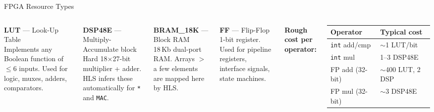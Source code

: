 \documentclass[aspectratio=169,12pt]{beamer}
\begin{document}
\begin{frame}{FPGA Resource Types}
\vspace{0.1cm}
\begin{columns}[T,totalwidth=\textwidth]


  \colorbox{Navy!8}{\parbox{\dimexpr\linewidth-2\fboxsep\relax}{\vspace{4pt}
    {\color{Navy}\bfseries LUT} — Look-Up Table\\[2pt]
    {\small Implements any Boolean function of $\leq$6 inputs.
    Used for logic, muxes, adders, comparators.}
  \vspace{4pt}}}
  \vspace{5pt}

  \colorbox{Teal!10}{\parbox{\dimexpr\linewidth-2\fboxsep\relax}{\vspace{4pt}
    {\color{Teal}\bfseries DSP48E} — Multiply-Accumulate block\\[2pt]
    {\small Hard 18$\times$27-bit multiplier + adder.
    HLS infers these automatically for \texttt{*} and \texttt{MAC}.}
  \vspace{4pt}}}
  \vspace{5pt}

  \colorbox{Orange!10}{\parbox{\dimexpr\linewidth-2\fboxsep\relax}{\vspace{4pt}
    {\color{Orange}\bfseries BRAM\_18K} — Block RAM\\[2pt]
    {\small 18\,Kb dual-port RAM. Arrays $>$ a few elements
    are mapped here by HLS.}
  \vspace{4pt}}}


  \vspace{0.1cm}

  \colorbox{BoxGray!10}{\parbox{\dimexpr\linewidth-2\fboxsep\relax}{\vspace{4pt}
    {\color{BoxGray}\bfseries FF} — Flip-Flop\\[2pt]
    {\small 1-bit register. Used for pipeline registers,
    interface signals, state machines.}
  \vspace{4pt}}}

  \vspace{10pt}
  {\small\color{Navy}\bfseries Rough cost per operator:}
  \vspace{4pt}

  \begin{tabular}{lp{3.8cm}}
    \hline
    \rowcolor{Navy!10}\textbf{Operator} & \textbf{Typical cost}\\
    \hline
    \texttt{int} add/cmp  & $\sim$1 LUT/bit\\
    \rowcolor{Navy!5}\texttt{int} mul    & 1--3 DSP48E\\
    FP add (32-bit)       & $\sim$400 LUT, 2 DSP\\
    \rowcolor{Navy!5}FP mul (32-bit)    & $\sim$3 DSP48E\\
    \hline
  \end{tabular}


\end{columns}
\end{frame}
\end{document}
